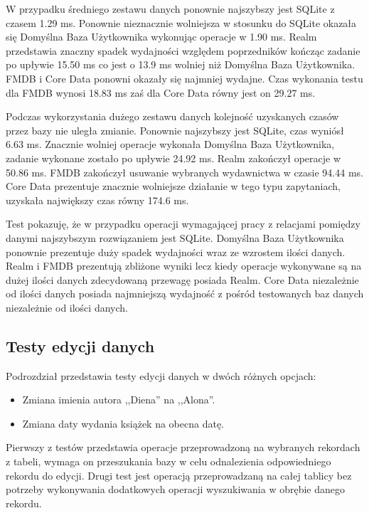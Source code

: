W przypadku średniego zestawu danych ponownie najszybszy jest SQLite z czasem 1.29 ms. Ponownie nieznacznie wolniejsza w stosunku do SQLite okazała się Domyślna Baza Użytkownika wykonując operacje w 1.90 ms. Realm przedstawia znaczny spadek wydajności względem poprzedników kończąc zadanie po upływie 15.50 ms co jest o 13.9 ms wolniej niż Domyślna Baza Użytkownika. FMDB i Core Data ponowni okazały się najmniej wydajne. Czas wykonania testu dla FMDB wynosi 18.83 ms zaś dla Core Data równy jest on 29.27 ms.

Podczas wykorzystania dużego zestawu danych kolejność uzyskanych czasów przez bazy nie uległa zmianie. Ponownie najszybszy jest SQLite, czas wyniósł 6.63 ms. Znacznie wolniej operacje wykonała Domyślna Baza Użytkownika, zadanie wykonane zostało po upływie 24.92 ms. Realm zakończył operacje w 50.86 ms. FMDB zakończył usuwanie wybranych wydawnictwa w czasie 94.44 ms. Core Data prezentuje znacznie wolniejsze działanie w tego typu zapytaniach, uzyskała największy czas równy 174.6 ms. 

Test pokazuję, że w przypadku operacji wymagającej pracy z relacjami pomiędzy danymi najszybszym rozwiązaniem jest SQLite. Domyślna Baza Użytkownika ponownie prezentuje duży spadek wydajności wraz ze wzrostem ilości danych. Realm i FMDB prezentują zbliżone wyniki lecz kiedy operacje wykonywane są na dużej ilości danych zdecydowaną przewagę posiada Realm. Core Data niezależnie od ilości danych posiada najmniejszą wydajność z pośród testowanych baz danych niezależnie od ilości danych.

\subsection{Testy edycji danych}

Podrozdział przedstawia testy edycji danych w dwóch różnych opcjach: 

\begin{itemize}
\item Zmiana imienia autora ,,Diena'' na ,,Alona''.
\item Zmiana daty wydania książek na obecna datę.
\end{itemize}

Pierwszy z testów przedstawia operacje przeprowadzoną na wybranych rekordach z tabeli, wymaga on przeszukania bazy w celu odnalezienia odpowiedniego rekordu do edycji. Drugi test jest operacją przeprowadzaną na całej tablicy bez potrzeby wykonywania dodatkowych operacji wyszukiwania w obrębie danego rekordu.

